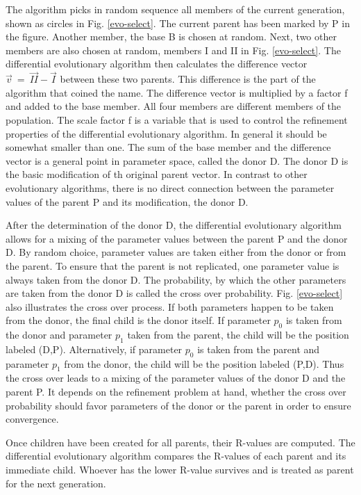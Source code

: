 The algorithm picks in random sequence all members of the current 
generation, shown as circles in Fig. \ref{evo-select}. The current
parent has been marked by P in the figure. Another member, the base B 
is chosen at random. Next, two other members are also 
chosen at random, members I and II in Fig. \ref{evo-select}. The
differential evolutionary algorithm then calculates the difference vector
$\vec{v} ~=~ \vec{II} - \vec{I}$ between these two parents. This difference
is the part of the algorithm that coined the name. The difference vector
is multiplied by a factor f and added to the base member. 
All four members are different members of the population. The
scale factor f is a variable that is used to control the refinement
properties of the differential evolutionary algorithm. In general it
should be somewhat smaller than one. The sum of the base member and the
difference vector is a general point in parameter space, called the 
donor D. The donor D is the basic modification of th original parent
vector. In contrast to other evolutionary algorithms, there is no
direct connection between the parameter values of the parent P and its
modification, the donor D. 

After the determination of the donor D, the differential evolutionary
algorithm allows for a mixing of the parameter values between the 
parent P and the donor D. By random choice, parameter values are taken
either from the donor or from the parent. To ensure that the parent 
is not replicated, one parameter value is always taken from the 
donor D. The probability, by which the other parameters are taken from 
the donor D is called the cross over probability. Fig. 
\ref{evo-select} also illustrates the cross over process. If 
both parameters happen to be taken from the donor, the final child is the
donor itself. If parameter $p_{0}$ is taken from the donor and 
parameter $p_{1}$ taken from the parent, the child will be the position
labeled (D,P). Alternatively, if parameter $p_{0}$ is taken from the 
parent and parameter $p_{1}$ from the donor, the child will be the
position labeled (P,D). Thus the cross over leads to a mixing of 
the parameter values of the donor D and the parent P. It depends on the
refinement problem at hand, whether the cross over probability should 
favor parameters of the donor or the parent in order to ensure convergence. 

Once children have been created for all parents, their R-values are 
computed. The differential evolutionary algorithm compares the 
R-values of each parent and its immediate child. Whoever has the 
lower R-value survives and is treated as parent for the next generation.

